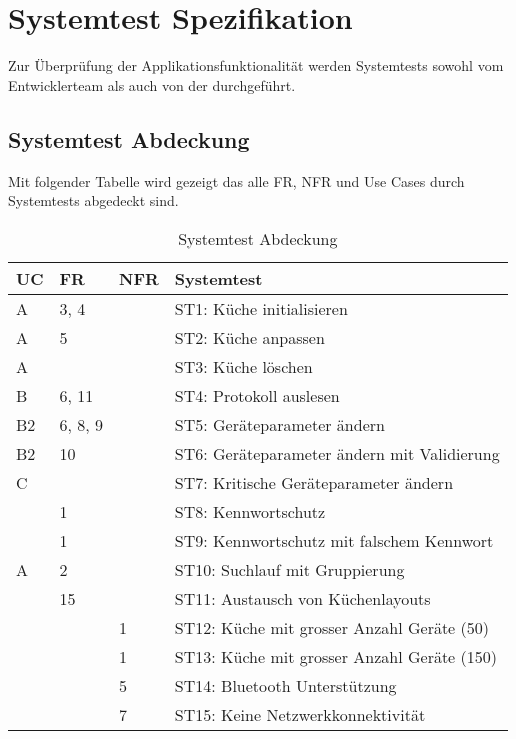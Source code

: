 \pagebreak
\section{Systemtest Spezifikation}
\label{s:Systemtest_Spezifikation}
Zur Überprüfung der Applikationsfunktionalität werden Systemtests sowohl vom Entwicklerteam als auch von der \fluxron{} durchgeführt.

\subsection{Systemtest Abdeckung}
\label{sub:systemtest_abdeckung}
Mit folgender Tabelle wird gezeigt das alle \ac{FR}, \ac{NFR} und Use Cases durch Systemtests abgedeckt sind.

\begin{table}[H]
\begin{tabularx}{\textwidth}{ l | l | l | X}
\textbf{\acs{UC}}& \textbf{\acs{FR}} & \textbf{\acs{NFR}} &\textbf{Systemtest}\\ \hline
A  & 3, 4 & & ST1: Küche initialisieren \\ \hline
A  & 5 & & ST2: Küche anpassen \\ \hline
A  &  & & ST3: Küche löschen \\ \hline
B  & 6, 11 & &  ST4: Protokoll auslesen \\ \hline
B2 & 6, 8, 9 & &  ST5: Geräteparameter ändern \\ \hline
B2 & 10 & & ST6: Geräteparameter ändern mit Validierung \\ \hline
C  &  & &  ST7: Kritische Geräteparameter ändern \\ \hline
   & 1 & &  ST8: Kennwortschutz  \\ \hline
   & 1 & & ST9: Kennwortschutz mit falschem Kennwort \\ \hline
A  & 2 & &  ST10: Suchlauf mit Gruppierung \\ \hline
   & 15 & &  ST11: Austausch von Küchenlayouts \\ \hline
   & & 1 &  ST12: Küche mit grosser Anzahl Geräte (50) \\ \hline
   & & 1 &  ST13: Küche mit grosser Anzahl Geräte (150) \\ \hline
   & & 5 &  ST14: Bluetooth Unterstützung \\ \hline
   & & 7 &  ST15: Keine Netzwerkkonnektivität \\
\end{tabularx}
\caption{Systemtest Abdeckung}
\end{table}

